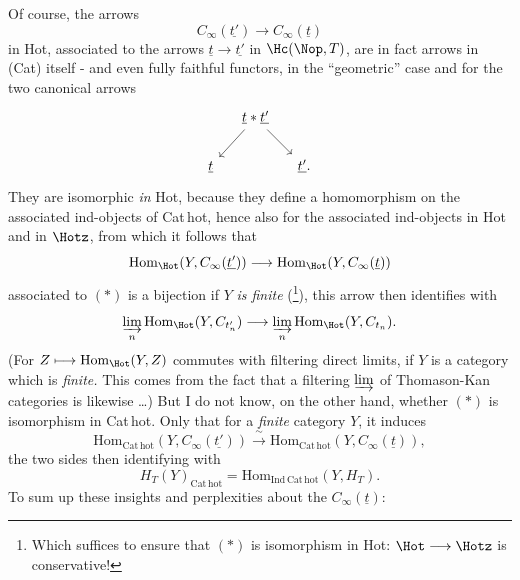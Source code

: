 Of course, the arrows
\[
C_\infty(\underline{t'}) \longrightarrow C_\infty(\underline{t}) \tag*{$(*)$}
\]
in Hot, associated to the arrows $\underline{t} \longrightarrow \underline{t'}$ in $\Hc(\Nop, T)$, are in fact arrows in %
(Cat) itself - and even fully faithful functors, in the ``geometric'' case and for the two canonical arrows
\[
\begin{tikzcd}[column sep=small]
 & \underline{t} * \underline{t'} \arrow[ld] \arrow[rd] & \\
\underline{t} & & \underline{t'}.
\end{tikzcd}
\]
They are isomorphic \textit{in} Hot, because they define a homomorphism on the associated ind-objects of Cat\,hot, hence also for the associated ind-objects in Hot and in $\Hotz$, from which it follows that
\[
\mathrm{Hom}_{\Hot}(Y, C_\infty(\underline{t'})) \longrightarrow \mathrm{Hom}_{\Hot}(Y, C_\infty(\underline{t}))
\]
associated to $(*)$ is a bijection if $Y$ \textit{is finite} (\footnote[26]{Which suffices to ensure that $(*)$ is isomorphism in Hot: $\Hot \longrightarrow \Hotz$ is conservative!}), this arrow then identifies with
\[
\underset{n}{\varinjlim}\, \mathrm{Hom}_{\Hot}(Y, C_{t'_n}) \longrightarrow \underset{n}{\varinjlim}\, \mathrm{Hom}_{\Hot}(Y, C_{t_n}).
\]
(For $Z \longmapsto \mathrm{Hom}_{\Hot}(Y, Z)$ commutes with filtering direct limits, if $Y$ is a category which is \textit{finite.} This comes from the fact that a filtering $\varinjlim$ of Thomason-Kan categories is likewise \dots) But I do not know, on the other hand, whether $(*)$ is isomorphism in Cat\,hot. Only that for a \textit{finite} category $Y$, it induces
\[
\mathrm{Hom}_{\mathrm{Cat\,hot}}(Y, C_\infty(\underline{t'})) \xrightarrow{\ \sim\ } \mathrm{Hom}_{\mathrm{Cat\,hot}}(Y, C_\infty(\underline{t})),
\]
the two sides then identifying with
\[
H_T(Y)_{\mathrm{Cat\,hot}} = \mathrm{Hom}_{\mathrm{Ind\,Cat\,hot}}(Y, H_T).
\]
To sum up these insights and perplexities about the $C_\infty(\underline{t})$:


